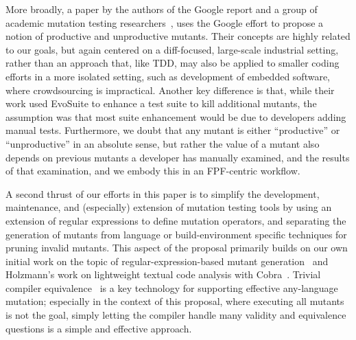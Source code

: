 More broadly, a paper by the
authors of the Google report and a group of academic mutation testing
researchers~\cite{ivankovic2018industrial}, uses the Google effort to
propose a notion of productive and unproductive mutants.  Their
concepts are highly related to our goals, but again centered on a
diff-focused, large-scale industrial setting, rather than an approach
that, like TDD, may also be applied to smaller coding efforts in a more
isolated setting, such as development of embedded software, where
crowdsourcing is impractical.  Another key difference is that, while their
work used EvoSuite to enhance a test suite to kill additional mutants,
the assumption was that most suite enhancement would be due to
developers adding manual tests.  Furthermore, we doubt that any mutant
is either ``productive'' or ``unproductive'' in an absolute sense, but
rather the value of a mutant also depends on previous mutants a
developer has manually examined, and the results of that examination,
and we embody this in an FPF-centric workflow.

A second thrust of our efforts in this paper is to simplify the
development, maintenance, and (especially) extension of mutation
testing tools by using an extension of regular expressions to define
mutation operators, and separating the generation of mutants from
language or build-environment specific techniques for pruning invalid
mutants.  This aspect of the proposal primarily builds on our own initial work on the topic of
regular-expression-based mutant generation~\cite{regexpMut} and
Holzmann's work on lightweight textual code analysis with
Cobra~\cite{Cobra}.  Trivial compiler equivalence~\cite{TCE} is a key
technology for supporting effective any-language mutation; especially
in the context of this proposal, where executing all mutants is not
the goal, simply letting the compiler handle many validity and
equivalence questions is a simple and effective approach.